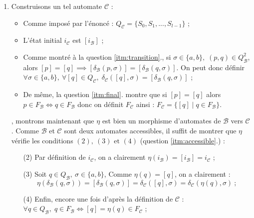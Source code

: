 \documentclass{article}
\begin{document}
\begin{enumerate}
    \item \label{itm:construC} Construisons un tel automate $\mathcal{C}$ :
        \begin{itemize}
            \item Comme imposé par l'énoncé : $ Q_\mathcal{C} = \{ S_0, S_1, ..., S_{l - 1} \}$ ;
            \item L'état initial $i_\mathcal{C}$ est $[i_\mathcal{B}]$ ;
            \item Comme montré à la question \ref{itm:transition}., si $\sigma \in \{a , b \}, \; (p, q) \in Q_\mathcal{B}^2$, alors $[p] = [q] \implies [\delta_\mathcal{B}(p, \sigma)] = [\delta_\mathcal{B}(q, \sigma)]$. \newline
                    On peut donc définir $\forall \sigma \in \{a, b\}, \: \forall [q] \in Q_\mathcal{C}, \; \delta_\mathcal{C}([q], \sigma) = [\delta_\mathcal{B}(q, \sigma)]$ ;
            \item De même, la question \ref{itm:final}. montre que si $[p] = [q]$ alors $p \in F_\mathcal{B} \Longleftrightarrow q \in F_\mathcal{B}$ donc on définit $F_\mathcal{C}$ ainsi : $F_\mathcal{C} = \{[q] \mid q \in F_\mathcal{B}\}$.
        \end{itemize}
        , montrons maintenant que $\eta$ est bien un morphisme d'automates de $\mathcal{B}$ vers $\mathcal{C}$. Comme $\mathcal{B}$ et $\mathcal{C}$ sont deux automates accessibles, il suffit de montrer que $\eta$ vérifie les conditions $(2), \: (3) \text{ et } (4)$ (question \ref{itm:accessible}.) :
        \begin{itemize}
            \item[(2)] Par définition de $i_\mathcal{C}$, on a clairement $\eta(i_\mathcal{B}) = [i_\mathcal{B}] = i_\mathcal{C}$ ;
            \item[(3)] Soit $q \in Q_\mathcal{B}, \: \sigma \in \{a , b \}$, Comme $\eta(q) = [q]$, on a clairement :
            \begin{equation*} \eta(\delta_\mathcal{B}(q, \sigma)) = [\delta_\mathcal{B}(q, \sigma)] = \delta_\mathcal{C}([q], \sigma) = \delta_\mathcal{C} (\eta(q), \sigma) \: ;
            \end{equation*}
            \item[(4)] Enfin, encore une fois d'après la définition de $\mathcal{C}$ : $\forall q \in Q_\mathcal{B}, \; q \in F_\mathcal{B} \Longleftrightarrow [q] = \eta(q) \in F_\mathcal{C}$ ;
        \end{itemize}


\end{enumerate}
\end{document}
